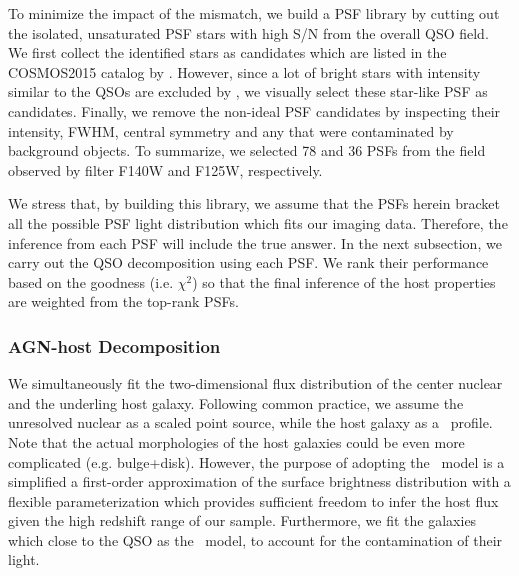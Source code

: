 \documentclass[apj]{emulateapj}
\begin{document}
To minimize the impact of the mismatch, we build a PSF library by cutting out the isolated, unsaturated PSF stars with high S/N from the overall QSO field. We first collect the identified stars as candidates which are listed in the COSMOS2015 catalog by \citet{Laigle2016}. However, since a lot of bright stars with intensity similar to the QSOs are excluded by \citet{Laigle2016}, we visually select these star-like PSF as candidates. Finally, we remove the non-ideal PSF candidates by inspecting their intensity, FWHM, central symmetry and any that were contaminated by background objects. To summarize, we selected 78 and 36 PSFs from the field observed by filter F140W and F125W, respectively.

We stress that, by building this library, we assume that the PSFs herein bracket all the possible PSF light distribution which fits our imaging data. Therefore, the inference from each PSF will include the true answer. In the next subsection, we carry out the QSO decomposition using each PSF. We rank their performance based on the goodness (i.e. $\chi^2$) so that the final inference of the host properties are weighted from the top-rank PSFs.

\subsubsection{AGN-host Decomposition}
We simultaneously fit the two-dimensional flux distribution of the center nuclear and the underling host galaxy. Following common practice, we assume the unresolved nuclear as a scaled point source, while the host galaxy as a \sersic\ profile. Note that the actual morphologies of the host galaxies could be even more complicated (e.g. bulge+disk). However, the purpose of adopting the \sersic\ model is a simplified a first-order approximation of the surface brightness distribution with a flexible parameterization which provides sufficient freedom to infer the host flux given the high redshift range of our sample. Furthermore, we fit the galaxies which close to the QSO as the \sersic\ model, to account for the contamination of their light.
\end{document}
